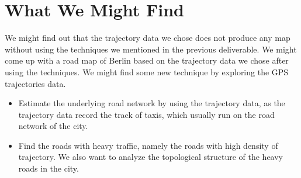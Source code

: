 \documentclass[11pt]{article}
\begin{document}
\section*{What We Might Find}
We might find out that the trajectory data we chose does not produce any map without using the techniques we mentioned in the previous deliverable. We might come up with a road map of Berlin based on the trajectory data we chose after using the techniques. We might find some new technique by exploring the GPS trajectories data. 
\begin{itemize}
  \item Estimate the underlying road network  by using the trajectory data, as the trajectory data record the track of taxis, which usually run on the road network of the city.
  
  \item  Find the roads with heavy traffic, namely the roads with high density of trajectory.   We also want to analyze the topological structure of the heavy roads in the city.

\end{itemize}






\end{document}
